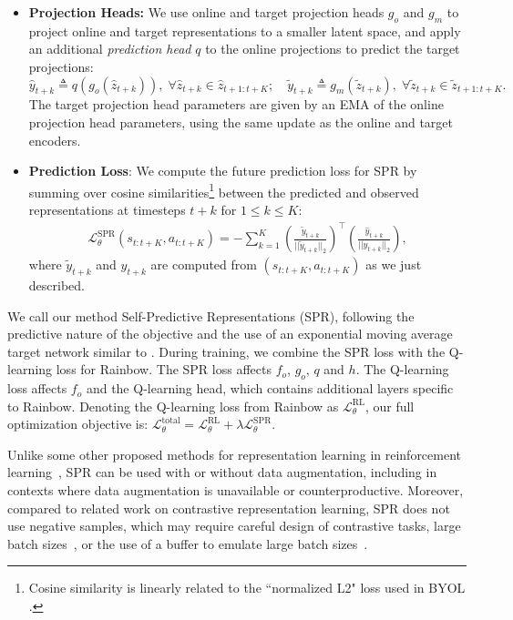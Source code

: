 \begin{itemize}[leftmargin=*]
    \item \textbf{Projection Heads:}  We use online and target projection heads $g_o$ and $g_m$ \citep{simCLR} to project online and target representations to a smaller latent space, and apply an additional \textit{prediction head} $q$ \citep{BYOL} to the online projections to predict the target projections:
    \begin{equation}
    \hat{y}_{t+k} \triangleq q(g_o(\hat{z}_{t+k})), \; \forall \hat{z}_{t+k} \in \hat{z}_{t+1:t+K}; \quad \tilde{y}_{t+k} \triangleq g_m(\tilde{z}_{t+k}), \; \forall \tilde{z}_{t+k} \in \tilde{z}_{t+1:t+K}.
    \end{equation}
    The target projection head parameters are given by an EMA of the online projection head parameters, using the same update as the online and target encoders.

\item \textbf{Prediction Loss}: We compute the future prediction loss for SPR by summing over cosine similarities\footnote{Cosine similarity is linearly related to the ``normalized L2" loss used in BYOL \citep{BYOL}.} between the predicted and observed representations at timesteps $t + k$ for $1 \leq k \leq K$:
\begin{align}{
    \mathcal{L}_\theta^{\text{SPR}}(s_{t:t+K}, a_{t:t+K}) = -\sum_{k=1}^K  \left ( \frac{\tilde{y}_{t+k}}{||\tilde{y}_{t+k}||_2} \right)^{\top} \left ( \frac{{\hat{y}}_{t+k}}{||{\hat{y}}_{t+k}||_2} \right ),
}
\end{align}
where $\tilde{y}_{t+k}$ and $\hat{y}_{t+k}$ are computed from $(s_{t:t+K}, a_{t:t+K})$ as we just described.

\end{itemize}

We call our method Self-Predictive Representations (SPR), following the predictive nature of the objective and the use of an exponential moving average target network similar to \citep{tarvainen2017mean, moco}.
During training, we combine the SPR loss with the Q-learning loss for Rainbow.
The SPR loss affects $f_o$, $g_o$, $q$ and $h$. The Q-learning loss affects $f_o$ and the Q-learning head, which contains additional layers specific to Rainbow.
Denoting the Q-learning loss from Rainbow as $\mathcal{L}^{\text{RL}}_\theta$, our full optimization objective is:
$\mathcal{L}^{\text{total}}_\theta = \mathcal{L}^{\text{RL}}_\theta + \lambda \mathcal{L}^{\text{SPR}}_\theta$.

Unlike some other proposed methods for representation learning in reinforcement learning~\citep{curl}, SPR can be used with or without data augmentation, including in contexts where data augmentation is unavailable or counterproductive.  Moreover, compared to related work on contrastive representation learning, SPR does not use negative samples, which may require careful design of contrastive tasks, large batch sizes~\citep{simCLR}, or the use of a buffer to emulate large batch sizes~\citep{moco}.

